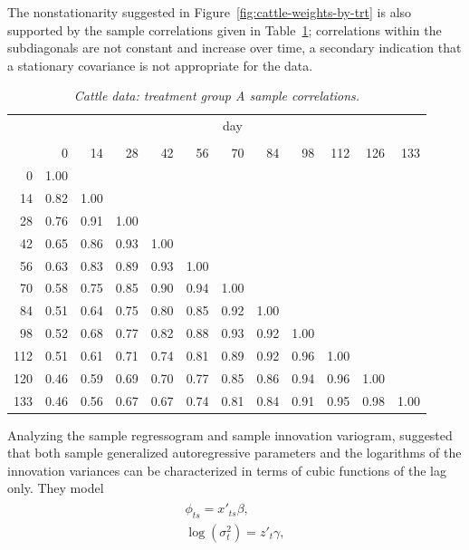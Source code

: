 \documentclass[12pt]{article}
\begin{document}
The nonstationarity suggested in Figure~\ref{fig:cattle-weights-by-trt} is also supported by the sample correlations given in Table~\ref{table:cattleA-sample-correlations}; correlations within the subdiagonals are not constant and increase over time, a secondary indication that a stationary covariance is not appropriate for the data. 
\begin{table}[H] 
\begin{footnotesize}
\begin{center}
\begin{tabular}{r|rrrrrrrrrrr}
& \multicolumn{11}{c}{day}\\
&&&&&&&&&&\\
& 0 & 14 & 28 & 42 & 56 & 70 & 84 & 98& 112& 126 &133\\
  \hline\noalign{\smallskip} 
0 & 1.00  \\ 
  14 & 0.82 & 1.00  \\ 
  28 & 0.76 & 0.91 & 1.00 & \\ 
  42 & 0.65 & 0.86 & 0.93 & 1.00 &  \\ 
  56 & 0.63 & 0.83 & 0.89 & 0.93 & 1.00 &  \\ 
  70 & 0.58 & 0.75 & 0.85 & 0.90 & 0.94 & 1.00 & \\ 
  84 & 0.51 & 0.64 & 0.75 & 0.80 & 0.85 & 0.92 & 1.00 &\\ 
  98 & 0.52 & 0.68 & 0.77 & 0.82 & 0.88 & 0.93 & 0.92 & 1.00 & \\ 
  112 & 0.51 & 0.61 & 0.71 & 0.74 & 0.81 & 0.89 & 0.92 & 0.96 & 1.00 & \\ 
  120 & 0.46 & 0.59 & 0.69 & 0.70 & 0.77 & 0.85 & 0.86 & 0.94 & 0.96 & 1.00 &  \\ 
  133 & 0.46 & 0.56 & 0.67 & 0.67 & 0.74 & 0.81 & 0.84 & 0.91 & 0.95 & 0.98 & 1.00 \\ 
   \hline
\end{tabular}
\caption{\textit{Cattle data: treatment group A sample correlations.}}\label{table:cattleA-sample-correlations}
\end{center}
\end{footnotesize}
\end{table}
Analyzing the sample regressogram and sample innovation variogram, \cite{pourahmadi1999joint} suggested that both sample generalized autoregressive parameters and the logarithms of the innovation variances can be characterized in terms of cubic functions of the lag only. They model 
\begin{align}
\begin{split} \label{eq:pourahmadi-cubic-model}
\phi_{ts} = x'_{ts}\beta, \\
\log\left(\sigma_t^2\right) = z'_{t}\gamma, 
\end{split}
\end{align}
\end{document}
